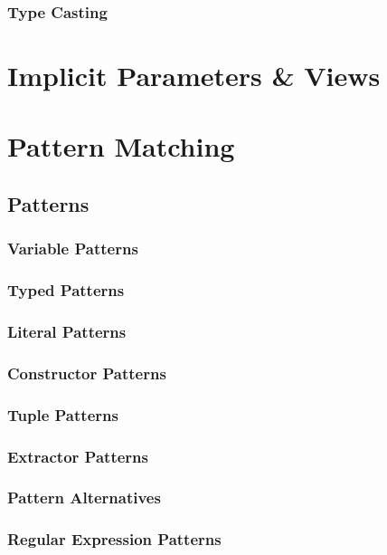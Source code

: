 \subsection{Type Casting}

\chapter{Implicit Parameters \& Views}

\chapter{Pattern Matching}

\section{Patterns}

\subsection{Variable Patterns}

\subsection{Typed Patterns}

\subsection{Literal Patterns}

\subsection{Constructor Patterns}

\subsection{Tuple Patterns}

\subsection{Extractor Patterns}

\subsection{Pattern Alternatives}

\subsection{Regular Expression Patterns}

